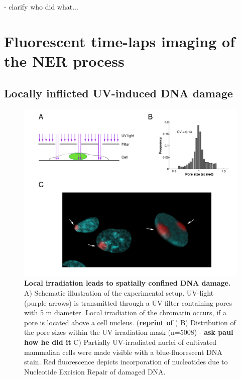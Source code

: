 - clarify who did what... 
	
	
\section{Fluorescent time-laps imaging of the NER process}

\subsection{Locally inflicted UV-induced DNA damage}
\label{sec:local_irradiation}
\begin{figure}[htbp]
	\begin{center}
		\includegraphics[width=1\textwidth]{Abbildungen/figure2_1.pdf}
		\caption{\textbf{Local irradiation leads to spatially confined DNA damage.} A) Schematic illustration of the experimental setup. UV-light (purple arrows) is transmitted through a UV filter containing pores with 5 \textmu m diameter. Local irradiation of the chromatin occurs, if a pore is located above a cell nucleus. (\textbf{reprint of }) B) Distribution of the pore sizes within the UV irradiation mask (n=5008) - \textbf{ask paul how he did it} C) Partially UV-irradiated nuclei of cultivated mammalian cells were made visible with a blue-fluorescent DNA stain. Red fluorescence depicts incorporation of nucleotides due to Nucleotide Excision Repair of damaged DNA.}
		\label{fig:accuMethod}
	\end{center}
\end{figure} 

